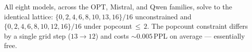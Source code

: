 \begin{table}[t]
  \vspace{0.4ex}
  {\footnotesize All eight models, across the OPT, Mistral, and Qwen families,
  solve to the identical lattice: $\{0,2,4,6,8,10,13,16\}/16$ unconstrained and
  $\{0,2,4,6,8,10,12,16\}/16$ under popcount$\,\le\,2$. The popcount constraint
  differs by a single grid step ($13\!\to\!12$) and costs $\sim\!0.005$\,PPL on
  average --- essentially free.}
\end{table}
